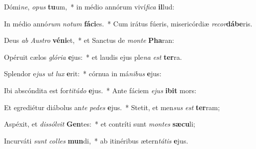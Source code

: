 \item Dómi\textit{ne}, \textit{o}\textit{pus} \textbf{tu}um,~* in médio annórum viví\textit{fi}\textit{ca} \textbf{il}lud:
\item In médio annó\textit{rum} \textit{no}\textit{tum} \textbf{fá}\textbf{ci}es.~* Cum irátus fúeris, misericórdiæ \textit{re}\textit{cor}\textbf{dá}\textbf{be}ris.
\item Deus \textit{ab} \textit{Aus}\textit{tro} \textbf{vé}\textbf{ni}et,~* et Sanctus de \textit{mon}\textit{te} \textbf{Pha}ran:
\item Opéruit cælos \textit{gló}\textit{ri}\textit{a} \textbf{e}jus:~* et laudis ejus ple\textit{na} \textit{est} \textbf{ter}ra.
\item Splendor e\textit{jus} \textit{ut} \textit{lux} \textbf{e}rit:~* córnua in má\textit{ni}\textit{bus} \textbf{e}jus:
\item Ibi abscóndita est for\textit{ti}\textit{tú}\textit{do} \textbf{e}jus.~* Ante fáciem \textit{e}\textit{jus} \textbf{i}\textbf{bit} mors:
\item Et egrediétur diábolus an\textit{te} \textit{pe}\textit{des} \textbf{e}jus.~* Stetit, et men\textit{sus} \textit{est} \textbf{ter}ram;
\item Aspéxit, et \textit{dis}\textit{sól}\textit{vit} \textbf{Gen}tes:~* et contríti sunt \textit{mon}\textit{tes} \textbf{sæ}\textbf{cu}li;
\item Incurváti \textit{sunt} \textit{col}\textit{les} \textbf{mun}di,~* ab itinéribus ætern\textit{tá}\textit{tis} \textbf{e}jus.
